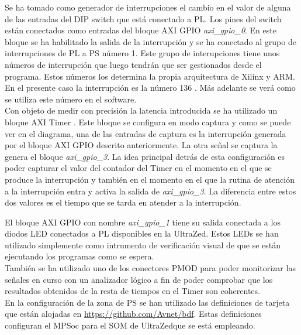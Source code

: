 Se ha tomado como generador de interrupciones el cambio en el valor de alguna de las entradas del \acrshort{DIP} switch que está conectado a \acrshort{PL}.
Los pines del switch están conectados como entradas del bloque \acrshort{AXI} \acrshort{GPIO} \cite{axi_gpio} \textit{axi\_gpio\_0}. En este bloque se ha habilitado la salida de la interrupción y se ha conectado al grupo de interrupciones de \acrshort{PL} a \acrshort{PS} número 1. Este grupo de interupciones tiene unos números de interrupción que luego tendrán que ser gestionados desde el programa. Estos números los determina la propia arquitectura de Xilinx y ARM. En el presente caso la interrupción es la número 136 \cite{axi_trm}. Más adelante se verá como se utiliza este número en el software.\\

Con objeto de medir con precisión la latencia introducida se ha utilizado un bloque \acrshort{AXI} Timer \cite{axi_timer}. Este bloque se configura en modo captura y como se puede ver en el diagrama, una de las entradas de captura es la interrupción generada por el bloque \acrshort{AXI} \acrshort{GPIO} descrito anteriormente. La otra señal se captura la genera el bloque \textit{axi\_gpio\_3}. La idea principal detrás de esta configuración es poder capturar el valor del contador del Timer en el momento en el que se produce la interrupción y también en el momento en el que la rutina de atención a la interrupción entra y activa la salida de \textit{axi\_gpio\_3}. La diferencia entre estos dos valores es el tiempo que se tarda en atender a la interrupción.

El bloque \acrshort{AXI} \acrshort{GPIO} con nombre \textit{axi\_gpio\_1} tiene su salida conectada a los diodos LED conectados a PL disponibles en la UltraZed. Estos LEDs se han utilizado simplemente como intrumento de verificación visual de que se están ejecutando los programas como se espera.\\

También se ha utilizado uno de los conectores PMOD para poder monitorizar las señales en curso con un analizador lógico a fin de poder comprobar que los resultados obtenidos de la resta de tiempos en el Timer son coherentes.\\

En la configuración de la zona de PS se han utilizado las definiciones de tarjeta que están alojadas en \url{https://github.com/Avnet/bdf}. Estas definiciones configuran el MPSoc para el SOM de UltraZed\texttrademark que se está empleando.

